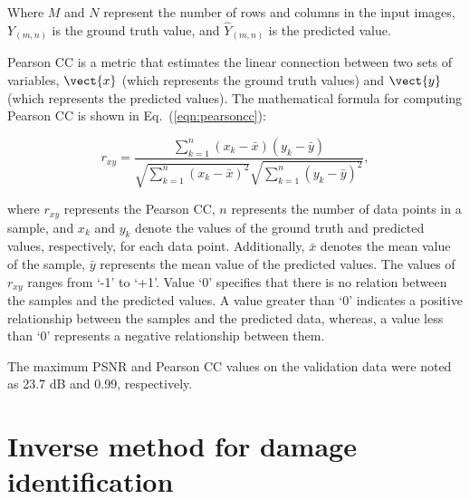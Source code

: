 \documentclass[sn-mathphys-num]{sn-jnl}%
\begin{document}
	Where \(M\) and \(N\) represent the number of rows and columns in the input 
	images, $Y_{(m, n)}$ is the ground truth value, and $\hat{Y}_{(m, n)}$ is 
	the predicted value.
	
	Pearson CC is a metric that estimates the linear connection between two 
	sets of variables, \(\vect{x}\) (which represents the ground truth values) 
	and \(\vect{y}\) (which represents the predicted values). 
	The mathematical formula for computing Pearson CC is shown in 
	Eq.~(\ref{eqn:pearsoncc}):
	
	\begin{equation}
		r_{x 
			y}=\frac{\sum_{k=1}^n\left(x_k-\bar{x}\right)\left(y_k-\bar{y}\right)}{\sqrt{\sum_{k=1}^n\left(x_k-\bar{x}\right)^2}
			\sqrt{\sum_{k=1}^n\left(y_k-\bar{y}\right)^2}},
		\label{eqn:pearsoncc}
	\end{equation}
	
	where $r_{xy}$ represents the Pearson CC, \(n\) represents the number of 
	data points in a sample, and $x_k$ and $y_k$ denote the values of the 
	ground truth and predicted values, respectively, for each data point. 
	Additionally, $\bar{x}$ denotes the mean value of the sample, $\bar{y}$ 
	represents the mean value of the predicted values. 
	The values of $r_{xy}$ ranges from ‘-1’ to ‘+1’. 
	Value ‘0’ specifies that there is no relation between the samples and the 
	predicted values. 
	A value greater than ‘0’ indicates a positive relationship between the 
	samples and the predicted data, whereas, a value less than ‘0’ represents a 
	negative relationship between them.
	
	The maximum PSNR and Pearson CC values on the validation data were noted as 
	23.7 dB and 0.99, respectively.
	\section{Inverse method for damage identification}
	
\end{document}
